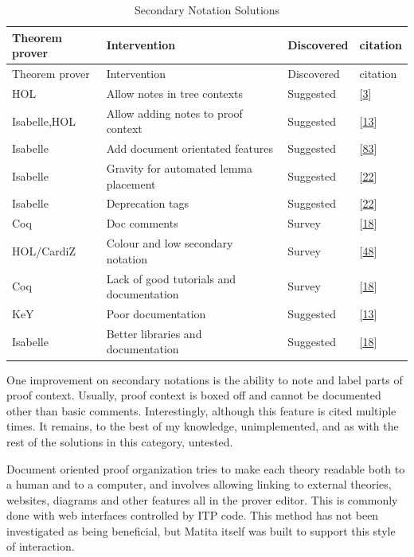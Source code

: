 \documentclass[
]{article}
\begin{document}
\hypertarget{tbl:secondary_notation}{}
\begin{longtable}[]{@{}llll@{}}
\caption{\label{tbl:secondary_notation}Secondary Notation
Solutions}\tabularnewline
\toprule
Theorem prover & Intervention & Discovered & citation \\
\midrule
\endfirsthead
\toprule
Theorem prover & Intervention & Discovered & citation \\
\midrule
\endhead
HOL & Allow notes in tree contexts & Suggested &
{[}\protect\hyperlink{ref-aitken_interactive_1998}{3}{]} \\
Isabelle,HOL & Allow adding notes to proof context & Suggested &
{[}\protect\hyperlink{ref-beckert_evaluating_2012}{13}{]} \\
Isabelle & Add document orientated features & Suggested &
{[}\protect\hyperlink{ref-wenzel_isabelle_2011}{83}{]} \\
Isabelle & Gravity for automated lemma placement & Suggested &
{[}\protect\hyperlink{ref-bourke_challenges_2012}{22}{]} \\
Isabelle & Deprecation tags & Suggested &
{[}\protect\hyperlink{ref-bourke_challenges_2012}{22}{]} \\
Coq & Doc comments & Survey &
{[}\protect\hyperlink{ref-berman_development_2014}{18}{]} \\
HOL/CardiZ & Colour and low secondary notation & Survey &
{[}\protect\hyperlink{ref-kadoda_cognitive_2000}{48}{]} \\
Coq & Lack of good tutorials and documentation & Survey &
{[}\protect\hyperlink{ref-berman_development_2014}{18}{]} \\
KeY & Poor documentation & Suggested &
{[}\protect\hyperlink{ref-beckert_evaluating_2012}{13}{]} \\
Isabelle & Better libraries and documentation & Suggested &
{[}\protect\hyperlink{ref-berman_development_2014}{18}{]} \\
\bottomrule
\end{longtable}

One improvement on secondary notations is the ability to note and label
parts of proof context. Usually, proof context is boxed off and cannot
be documented other than basic comments. Interestingly, although this
feature is cited multiple times. It remains, to the best of my
knowledge, unimplemented, and as with the rest of the solutions in this
category, untested.

Document oriented proof organization tries to make each theory readable
both to a human and to a computer, and involves allowing linking to
external theories, websites, diagrams and other features all in the
prover editor. This is commonly done with web interfaces controlled by
ITP code. This method has not been investigated as being beneficial, but
Matita itself was built to support this style of interaction.
\end{document}
